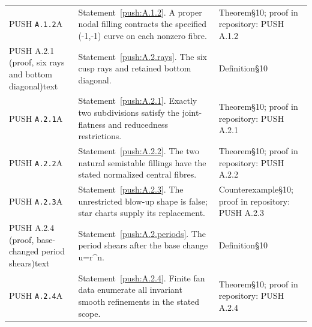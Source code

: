 \documentclass[11pt,a4paper]{article}
\theoremstyle{plain}
\theoremstyle{definition}
\begin{document}
\begin{longtable}{@{}L{.18\linewidth}L{.48\linewidth}L{.29\linewidth}@{}}
PUSH \nolinkurl{A.1.2}\newline A & Statement~\ref{push:A.1.2}. A proper nodal filling contracts the specified (-1,-1) curve on each nonzero fibre.\newline {} & Theorem\newline §10; proof in repository:\allowbreak{} PUSH A.1.2\\
PUSH A.2.1 (proof, six rays and bottom diagonal)\newline text & Statement~\ref{push:A.2.rays}. The six cusp rays and retained bottom diagonal.\newline {} & Definition\newline §10\\
PUSH \nolinkurl{A.2.1}\newline A & Statement~\ref{push:A.2.1}. Exactly two subdivisions satisfy the joint-flatness and reducedness restrictions.\newline {} & Theorem\newline §10; proof in repository:\allowbreak{} PUSH A.2.1\\
PUSH \nolinkurl{A.2.2}\newline A & Statement~\ref{push:A.2.2}. The two natural semistable fillings have the stated normalized central fibres.\newline {} & Theorem\newline §10; proof in repository:\allowbreak{} PUSH A.2.2\\
PUSH \nolinkurl{A.2.3}\newline A & Statement~\ref{push:A.2.3}. The unrestricted blow-up shape is false; star charts supply its replacement.\newline {} & Counterexample\newline §10; proof in repository:\allowbreak{} PUSH A.2.3\\
PUSH A.2.4 (proof, base-changed period shears)\newline text & Statement~\ref{push:A.2.periods}. The period shears after the base change u=r\textasciicircum{}n.\newline {} & Definition\newline §10\\
PUSH \nolinkurl{A.2.4}\newline A & Statement~\ref{push:A.2.4}. Finite fan data enumerate all invariant smooth refinements in the stated scope.\newline {} & Theorem\newline §10; proof in repository:\allowbreak{} PUSH A.2.4\\

\end{longtable}
\end{document}
